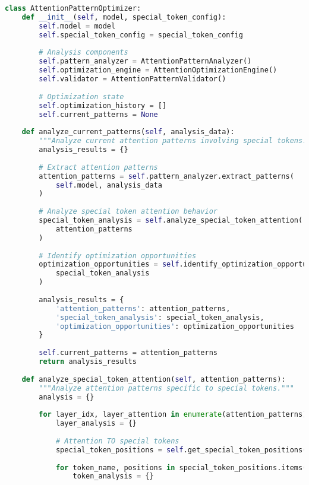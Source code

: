 \begin{lstlisting}[language=Python, caption=Attention pattern analysis and optimization framework]
class AttentionPatternOptimizer:
    def __init__(self, model, special_token_config):
        self.model = model
        self.special_token_config = special_token_config
        
        # Analysis components
        self.pattern_analyzer = AttentionPatternAnalyzer()
        self.optimization_engine = AttentionOptimizationEngine()
        self.validator = AttentionPatternValidator()
        
        # Optimization state
        self.optimization_history = []
        self.current_patterns = None
        
    def analyze_current_patterns(self, analysis_data):
        """Analyze current attention patterns involving special tokens."""
        analysis_results = {}
        
        # Extract attention patterns
        attention_patterns = self.pattern_analyzer.extract_patterns(
            self.model, analysis_data
        )
        
        # Analyze special token attention behavior
        special_token_analysis = self.analyze_special_token_attention(
            attention_patterns
        )
        
        # Identify optimization opportunities
        optimization_opportunities = self.identify_optimization_opportunities(
            special_token_analysis
        )
        
        analysis_results = {
            'attention_patterns': attention_patterns,
            'special_token_analysis': special_token_analysis,
            'optimization_opportunities': optimization_opportunities
        }
        
        self.current_patterns = attention_patterns
        return analysis_results
    
    def analyze_special_token_attention(self, attention_patterns):
        """Analyze attention patterns specific to special tokens."""
        analysis = {}
        
        for layer_idx, layer_attention in enumerate(attention_patterns):
            layer_analysis = {}
            
            # Attention TO special tokens
            special_token_positions = self.get_special_token_positions()
            
            for token_name, positions in special_token_positions.items():
                token_analysis = {}
                

\end{lstlisting}
